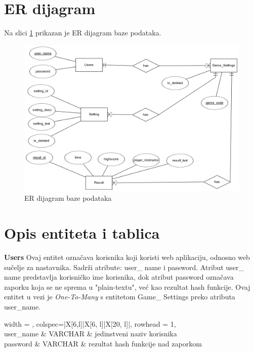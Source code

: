 \documentclass[times, utf8, zavrsni, numeric]{fer}
\begin{document}
	
	\section{ER dijagram}
		Na slici \ref{fig:erdijagram} prikazan je ER dijagram baze podataka.
		\begin{figure}[H]
			\includegraphics[width=\linewidth]{"slike/ER.png"} 
			\centering
			\caption{ER dijagram baze podataka}
			\label{fig:erdijagram}
		\end{figure}


\section{Opis entiteta i tablica}
		\textbf {Users} \hspace{5mm}
		{Ovaj entitet označava korisnika koji koristi web aplikaciju, odnosno web sučelje za nastavnika. Sadrži atribute: user\_ name i password.
		Atribut user\_ name predstavlja korisničko ime korisnika, dok atribut password označava zaporku koja se ne sprema u "plain-textu", već kao 
		rezultat hash funkcije.
		Ovaj entitet u vezi je \textit{One-To-Many} s entitetom Game\_ Settings preko atributa user\_name.}
			
			\begin{longtblr}[
				label=userstbl,
				entry=Relacija Users,
				caption=Relacija Users
				]{
					width = \textwidth,
					colspec={|X[6,l]|X[6, l]|X[20, l]|}, 
					rowhead = 1,
				} %
				\hline {}	 \\ \hline[3pt]
				user\_name & VARCHAR	&  	jedinstveni naziv korisnika  	\\ \hline
				password	& VARCHAR &  rezultat hash funkcije nad zaporkom 	\\ \hline 
			\end{longtblr}
\end{document}
